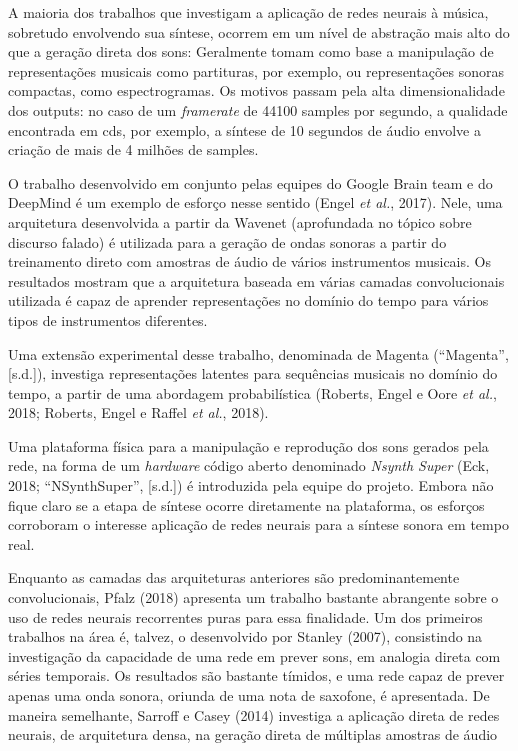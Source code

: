 \documentclass[]{article}
\begin{document}
A maioria dos trabalhos que investigam a aplicação de redes neurais à
música, sobretudo envolvendo sua síntese, ocorrem em um nível de
abstração mais alto do que a geração direta dos sons: Geralmente tomam
como base a manipulação de representações musicais como partituras, por
exemplo, ou representações sonoras compactas, como espectrogramas. Os
motivos passam pela alta dimensionalidade dos outputs: no caso de um
\emph{framerate} de 44100 samples por segundo, a qualidade encontrada em
cds, por exemplo, a síntese de 10 segundos de áudio envolve a criação de
mais de 4 milhões de samples.

O trabalho desenvolvido em conjunto pelas equipes do Google Brain team e
do DeepMind é um exemplo de esforço nesse sentido (Engel \emph{et al.},
2017). Nele, uma arquitetura desenvolvida a partir da Wavenet
(aprofundada no tópico sobre discurso falado) é utilizada para a geração
de ondas sonoras a partir do treinamento direto com amostras de áudio de
vários instrumentos musicais. Os resultados mostram que a arquitetura
baseada em várias camadas convolucionais utilizada é capaz de aprender
representações no domínio do tempo para vários tipos de instrumentos
diferentes.

Uma extensão experimental desse trabalho, denominada de Magenta
(``Magenta'', {[}s.d.{]}), investiga representações latentes para
sequências musicais no domínio do tempo, a partir de uma abordagem
probabilística (Roberts, Engel e Oore \emph{et al.}, 2018; Roberts,
Engel e Raffel \emph{et al.}, 2018).

Uma plataforma física para a manipulação e reprodução dos sons gerados
pela rede, na forma de um \emph{hardware} código aberto denominado
\emph{Nsynth Super} (Eck, 2018; ``NSynthSuper'', {[}s.d.{]}) é
introduzida pela equipe do projeto. Embora não fique claro se a etapa de
síntese ocorre diretamente na plataforma, os esforços corroboram o
interesse aplicação de redes neurais para a síntese sonora em tempo
real.

Enquanto as camadas das arquiteturas anteriores são predominantemente
convolucionais, Pfalz (2018) apresenta um trabalho bastante abrangente
sobre o uso de redes neurais recorrentes puras para essa finalidade. Um
dos primeiros trabalhos na área é, talvez, o desenvolvido por Stanley
(2007), consistindo na investigação da capacidade de uma rede em prever
sons, em analogia direta com séries temporais. Os resultados são
bastante tímidos, e uma rede capaz de prever apenas uma onda sonora,
oriunda de uma nota de saxofone, é apresentada. De maneira semelhante,
Sarroff e Casey (2014) investiga a aplicação direta de redes neurais, de
arquitetura densa, na geração direta de múltiplas amostras de áudio
\end{document}
